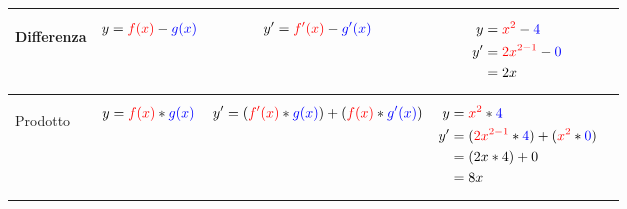 \documentclass[10pt, a4paper]{article}
\begin{document}
\begin{center}
{\begin{tabular}{ |p{5em} | p{5em} | p{5em} | p{7em} | p{2cm}| }
                \begin{center}
                    Differenza
                \end{center} &
                \begin{align}
                    y= {\color{red}f(x)} - {\color{blue}g(x)} \nonumber
                \end{align}  &
                \begin{align}
                    y'= {\color{red}f'(x)} - {\color{blue}g'(x)} \nonumber
                \end{align} &
                {
                    \begin{align}
                        y  &= {\color{red}x^2} - {\color{blue}4}   \nonumber \\
                        y' &= {\color{red}2x^{2-1}} - {\color{blue}0} \nonumber \\
                           &= 2x \nonumber 
                    \end{align}
                } &
                \begin{center}
                \end{center} \\ 

                \hline
                
                \begin{center}
                    Prodotto
                \end{center} &
                \begin{align}
                    y= {\color{red}f(x)} * {\color{blue}g(x)} \nonumber
                \end{align}  &
                \begin{align}
                    y'= ({\color{red}f'(x)} * {\color{blue}g(x)} ) + ( {\color{red}f(x)} * {\color{blue}g'(x)}) \nonumber
                \end{align} &
                {
                    \begin{align}
                        y  &= {\color{red}x^2} * {\color{blue}4}   \nonumber \\
                        y' &= ( {\color{red}2x^{2-1}} * {\color{blue}4} ) + ( {\color{red}x^2} * {\color{blue}0} ) \nonumber \\
                           &= (2x * 4) + 0 \nonumber \\
                           &= 8x \nonumber 
                    \end{align}
                } &
                \begin{center}
                \end{center} \\ 


\end{tabular}}
\end{center}
\end{document}

